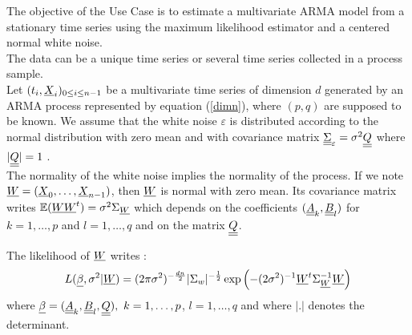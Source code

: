 \renewcommand{\filename}{docUC_StocProc_ARMA_Multivariate_Estimation_Likelihood.tex}
\renewcommand{\filetitle}{UC : Estimation of a multivariate ARMA process}
\HeaderIIILevel

\label{ARMAMultivariateEstimationLikelihood}



The objective of the Use Case is to estimate a multivariate ARMA model from a stationary time series using the maximum likelihood estimator and a centered normal white noise.\\

The data can be a unique time series or several time series collected in a process sample. \\

Let $(t_i, {\underline{X}}_i)_{0\leq i \leq n-1}$ be a multivariate time series of dimension $d$ generated by an ARMA process represented by equation (\ref{dimn}), where $(p,q)$ are supposed to be known. We assume that the white noise $\varepsilon$ is distributed according to the normal distribution with zero mean and with covariance matrix ${\underline{\underline{\Sigma}}}_{\varepsilon} = \sigma^2{\underline{\underline{Q}}}$ where $|{\underline{\underline{Q}}}| = 1$ .\\

The normality of the white noise implies the normality of the process. If we note ${\underline{W}} = ({\underline{X}}_0, \hdots, {\underline{X}}_{n-1})$, then ${\underline{W}}$ is normal with zero mean. Its  covariance matrix writes $\mathbb{E}({\underline{W}}{\underline{W}}^t)= \sigma^2 \Sigma_{{\underline{W}}}$ which depends on the coefficients $({\underline{\underline{A}}}_k, {\underline{\underline{B}}}_l)$ for $k = 1,\ldots,p$ and $l = 1,\ldots, q$ and on the matrix ${\underline{\underline{Q}}}$.

The likelihood of ${\underline{W}}$ writes :
\begin{equation}\label{likelihoodMV}
  L({\underline{\beta}}, \sigma^2 | {\underline{W}}) = (2 \pi \sigma^2) ^{-\frac{d n}{2}} |\Sigma_{w}|^{-\frac{1}{2}} \exp\left(- (2\sigma^2)^{-1}  {\underline{W}}^t \Sigma_{{\underline{W}}}^{-1}  {\underline{W}} \right)
\end{equation}
where  ${\underline{\beta}} = ({\underline{\underline{A}}}_{k}, {\underline{\underline{B}}}_{l}, {\underline{\underline{Q}}}),\ k = 1,\ldots,p$, $l = 1,\ldots, q$ and where  $|.|$ denotes the determinant.\\

